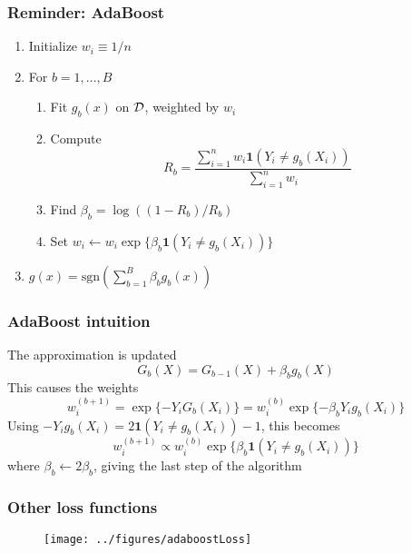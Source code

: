 \documentclass[12pt]{beamer}
\begin{document}
\begin{frame}[fragile]
\frametitle{Reminder: AdaBoost}
\begin{enumerate}
\item Initialize $w_i \equiv 1/n$
\item For $b = 1,\ldots,B$
\begin{enumerate}
\item Fit $g_b(x)$ on $\mathcal{D}$, weighted by $w_i$

\item Compute
\[
R_b = \frac{\sum_{i=1}^n w_i \mathbf{1}(Y_i \neq g_b(X_i))}{\sum_{i=1}^n w_i}
\]

\item \textcolor<1>{redmain}{Find $\beta_b = \log((1-R_b)/R_b)$}
\item \textcolor<2>{redmain}{Set $w_i \leftarrow w_i\exp\{\beta_b \mathbf{1}(Y_i \neq g_b(X_i))\}$}
\end{enumerate}
\item {} $g(x) = \textrm{sgn}\left(\sum_{b=1}^B \beta_b g_b(x)\right)$
\end{enumerate}
\end{frame}


\begin{frame}[fragile]
\frametitle{AdaBoost intuition}
The approximation is updated
\[
G_b(X) = G_{b-1}(X) + \beta_bg_b(X)
\]
This causes the weights
\[
w_i^{(b+1)} = \exp\{-Y_iG_{b}(X_i)\} = w_i^{(b)} \exp\{-\beta_b Y_i g_b(X_i)\}
\]
Using $-Y_ig_b(X_i)  = 2 \mathbf{1}(Y_i \neq g_b(X_i))  - 1$, this becomes
\[
w_i^{(b+1)} \propto w_i^{(b)} \exp\{\beta_b \mathbf{1}(Y_i \neq g_b(X_i))\}
\]
where $\beta_b \leftarrow 2\beta_b$, giving the last step of the algorithm
\end{frame}


\begin{frame}[fragile]
\frametitle{Other loss functions}
\begin{figure}
\centering
\texttt{[image: ../figures/adaboostLoss]}
\end{figure}
\end{frame}
\end{document}

